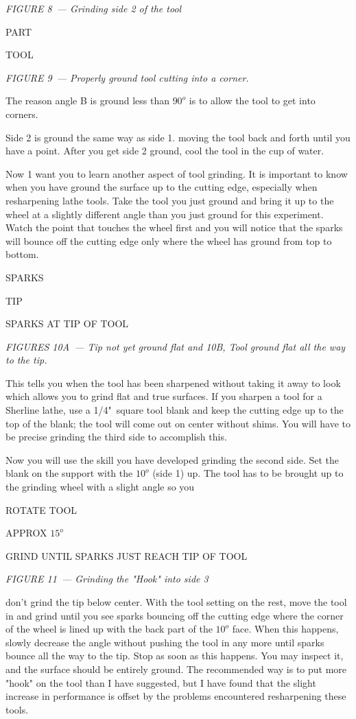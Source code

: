 \textit{FIGURE 8\ --- Grinding side 2 of the tool}
\bigskip

\bigskip
PART

TOOL
\bigskip

\textit{FIGURE 9\ --- Properly ground tool cutting into a corner.}


The reason angle B is ground less than $90^o$ is to allow the tool to get into
corners.

Side 2 is ground the same way as side 1. moving the tool back and forth until
you have a point. After you get side 2 ground, cool the tool in the cup of
water.

Now 1 want you to learn another aspect of tool grinding. It is important to know
when you have ground the surface up to the cutting edge, especially when
resharpening lathe tools. Take the tool you just ground and bring it up to the
wheel at a slightly different angle than you just ground for this experiment.
Watch the point that touches the wheel first and you will notice that the sparks
will bounce off the cutting edge only where the wheel has ground from top to
bottom.

\bigskip
SPARKS

TIP

SPARKS AT TIP OF TOOL
\bigskip

\textit{FIGURES 10A\ --- Tip not yet ground flat and 10B, Tool ground flat all
the way to the tip.}
\bigskip

This tells you when the tool has been sharpened without taking it away to look
which allows you to grind flat and true surfaces. If you sharpen a tool for a
Sherline lathe, use a 1/4"\ square tool blank and keep the cutting edge up to
the top of the blank; the tool will come out on center without shims. You will
have to be precise grinding the third side to accomplish this.


Now you will use the skill you have developed grinding the second side. Set the
blank on the support with the $10^o$ (side 1) up. The tool has to be brought up
to the grinding wheel with a slight angle so you

\bigskip
ROTATE TOOL

APPROX $15^o$

GRIND UNTIL SPARKS JUST REACH TIP OF TOOL
\bigskip

\textit{FIGURE 11\ --- Grinding the "Hook" into side 3}
\bigskip

don't grind the tip below center. With the tool setting on the rest, move the
tool in and grind until you see sparks bouncing off the cutting edge where the
corner of the wheel is lined up with the back part of the $10^o$ face. When
this happens, slowly decrease the angle without pushing the tool in any more until
sparks bounce all the way to the tip. Stop as soon as this happens. You may
inspect it, and the surface should be entirely ground. The recommended way is to
put more "hook" on the tool than I have suggested, but I have found that the
slight increase in performance is offset by the problems encountered
resharpening these tools.

\secup

\secup
